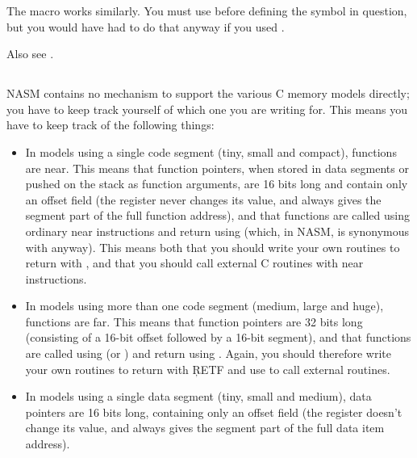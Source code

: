 The  macro works similarly. You must use 
before defining the symbol in question, but you would have had to do
that anyway if you used .

Also see .

\subsection{}
\label{subsec:16cmodels}

NASM contains no mechanism to support the various C memory models
directly; you have to keep track yourself of which one you are
writing for. This means you have to keep track of the following
things:

\begin{itemize}
    \item{In models using a single code segment (tiny, small and compact),
        functions are near. This means that function pointers, when stored
        in data segments or pushed on the stack as function arguments, are
        16 bits long and contain only an offset field (the  register
        never changes its value, and always gives the segment part of the
        full function address), and that functions are called using ordinary
        near  instructions and return using  (which, in
        NASM, is synonymous with  anyway). This means both that you
        should write your own routines to return with , and that you
        should call external C routines with near  instructions.}

    \item{In models using more than one code segment (medium, large and
        huge), functions are far. This means that function pointers are 32
        bits long (consisting of a 16-bit offset followed by a 16-bit
        segment), and that functions are called using  (or
        ) and return using . Again, you should
        therefore write your own routines to return with \c{RETF} and use
         to call external routines.}

    \item{In models using a single data segment (tiny, small and medium),
        data pointers are 16 bits long, containing only an offset field (the
         register doesn't change its value, and always gives the
        segment part of the full data item address).}


\end{itemize}
